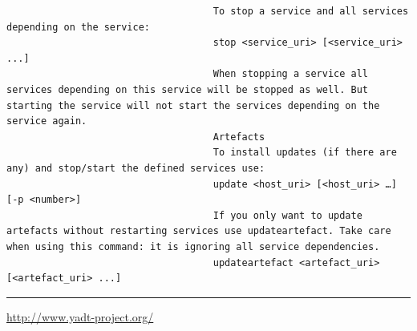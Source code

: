\documentclass[10pt,landscape]{article}
\begin{document}
\begin{multicols}{3}
\begin{verbatim}
                                    To stop a service and all services depending on the service:
                                    stop <service_uri> [<service_uri> ...]
                                    When stopping a service all services depending on this service will be stopped as well. But starting the service will not start the services depending on the service again.
                                    Artefacts
                                    To install updates (if there are any) and stop/start the defined services use:
                                    update <host_uri> [<host_uri> …] [-p <number>]
                                    If you only want to update artefacts without restarting services use updateartefact. Take care when using this command: it is ignoring all service dependencies.
                                    updateartefact <artefact_uri> [<artefact_uri> ...]

\end{verbatim}


\rule{0.3\linewidth}{0.25pt}
\scriptsize

\href{http://www.yadt-project.org/}{http://www.yadt-project.org/}

\end{multicols}
\end{document}
